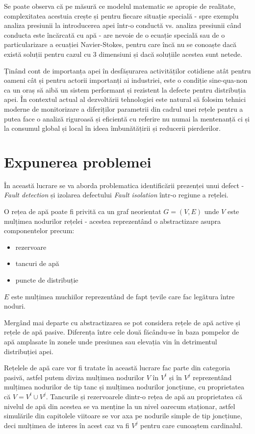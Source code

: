 Se poate observa că pe măsură ce modelul matematic se apropie de realitate, complexitatea acestuia crește și pentru fiecare situație specială - spre exemplu analiza presiunii la  introducerea apei într-o conductă vs. analiza presiunii când conducta este încărcată cu apă - are nevoie de o ecuație specială sau de o particularizare a ecuației Navier-Stokes, pentru care încă nu se conoaște dacă există soluții pentru cazul cu 3 dimensiuni și dacă soluțiile acestea sunt netede. 

Ținând cont de importanța apei în desfășurarea activităților cotidiene atât pentru oameni cât și pentru actorii importanți ai industriei, este o condiție sine-qua-non ca un oraș să aibă un sistem performant și rezistent la defecte pentru distribuția apei. În contextul actual al dezvoltării tehnologiei este natural să folosim tehnici moderne de monitorizare a diferiților parametrii din cadrul unei rețele pentru a putea face o analiză riguroasă și eficientă cu referire nu numai la mentenanță ci și la consumul global și local în ideea îmbunătățirii și reducerii pierderilor.


\section{Expunerea problemei}

În această lucrare se va aborda problematica identificării prezenței unui defect - \textit{Fault detection} și izolarea defectului \textit{Fault isolation} într-o regiune a rețelei.

O rețea de apă poate fi privită ca un graf neorientat $G = (V, E)$ unde $V$ este mulțimea nodurilor rețelei - acestea reprezentând o abstractizare asupra componentelor precum:
\begin{itemize}
\item rezervoare
\item tancuri de apă
\item puncte de distribuție
\end{itemize} 

$E$ este mulțimea muchiilor reprezentând de fapt țevile care fac legătura între noduri.

Mergând mai departe cu abstractizarea se pot considera rețele de apă active și rețele de apă pasive. Diferența între cele două făcându-se în baza pompelor de apă amplasate în zonele unde presiunea sau elevația vin în detrimentul distribuției apei.

Rețelele de apă care vor fi tratate în această lucrare fac parte din categoria pasivă, astfel putem diviza mulțimea nodurilor $V$ în $V^t$ și în $V^j$ reprezentând mulțimea nodurilor de tip tanc și mulțimea nodurilor joncțiune, cu proprietatea că $V = V^t \cup V^j$. Tancurile și rezervoarele dintr-o rețea de apă au proprietatea că nivelul de apă din acestea se va menține la un nivel oarecum staționar, astfel simulările din capitolele viitoare se vor axa pe nodurile simple de tip joncțiune, deci mulțimea de interes în acest caz va fi $V^j$ pentru care cunoaștem cardinalul.

